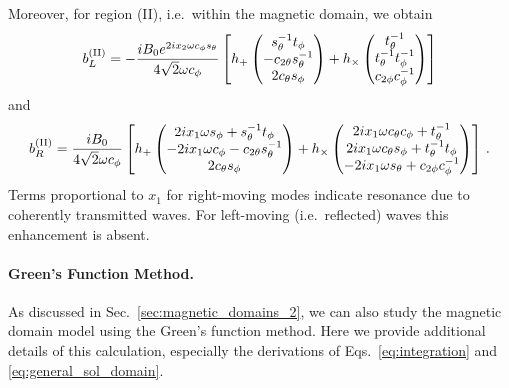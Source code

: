 \documentclass[a4paper,11pt]{article}
\begin{document}
%
Moreover, for region (II), i.e.\ within the magnetic domain, we obtain
\begin{align}
    b_{L}^{\rm (II)} = -\frac{i B_{0} e^{2 i x_{2} \omega c_{\phi} s_{\theta}} }{4 \sqrt{2} \omega c_{\phi}} \left[ h_{+} \begin{pmatrix}
        s_{\theta}^{-1}  t_{\phi} \\
        - c_{2\theta} s_{\theta}^{-1}  \\ 2 c_{\theta} s_{\phi} 
    \end{pmatrix} + h_{\times}
    \begin{pmatrix}
        t_{\theta}^{-1}  \\
        t_{\theta}^{-1}  t_{\phi}^{-1} \\
        c_{2\phi} c_{\phi}^{-1}
    \end{pmatrix}
 \right]
\end{align}
%
and
%
\begin{align}
    b_{R}^{\rm (II)} = \frac{ i B_{0}  }{4 \sqrt{2} \omega c_{\phi}} \left[ h_{+} \begin{pmatrix}
      2 i x_{1} \omega s_{\phi} + s_{\theta}^{-1} t_{\phi}  \\
       - 2 i x_{1}  \omega c_{\phi} - c_{2\theta} s_{\theta}^{-1} \\ 2 c_{\theta} s_{\phi} 
    \end{pmatrix} + h_{\times}
    \begin{pmatrix}
        2 i x_{1} \omega c_{\theta} c_{\phi} + t_{\theta}^{-1}   \\
        2 i x_{1} \omega c_{\theta} s_{\phi} + t_{\theta}^{-1} t_{\phi} \\
       - 2 i x_{1} \omega s_{\theta} + c_{2\phi} c_{\phi}^{-1}
    \end{pmatrix}
 \right] \,.
\end{align}
%
Terms proportional to $x_{1}$ for right-moving modes indicate resonance due to coherently transmitted waves. 
%
For left-moving (i.e.\ reflected) waves this enhancement is absent.




\paragraph{Green's Function Method.}
%
As discussed in Sec.~\ref{sec:magnetic_domains_2}, we can also study the magnetic domain model using the Green's function method.
%
Here we provide additional details of this calculation, especially the derivations of Eqs.~\eqref{eq:integration} and \eqref{eq:general_sol_domain}. 
\end{document}

